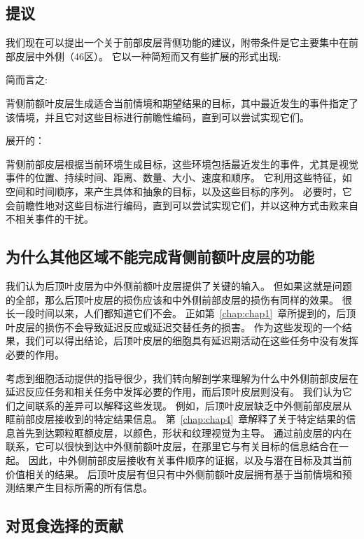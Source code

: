 \subsection{提议}

我们现在可以提出一个关于前部皮层背侧功能的建议，附带条件是它主要集中在前部皮层中外侧（46区）。
它以一种简短而又有些扩展的形式出现:

简而言之:

背侧前额叶皮层生成适合当前情境和期望结果的目标，其中最近发生的事件指定了该情境，并且它对这些目标进行前瞻性编码，直到可以尝试实现它们。


展开的：

背侧前部皮层根据当前环境生成目标，这些环境包括最近发生的事件，尤其是视觉事件的位置、持续时间、距离、数量、大小、速度和顺序。
它利用这些特征，如空间和时间顺序，来产生具体和抽象的目标，以及这些目标的序列。
必要时，它会前瞻性地对这些目标进行编码，直到可以尝试实现它们，并以这种方式击败来自不相关事件的干扰。



\subsection{为什么其他区域不能完成背侧前额叶皮层的功能}

我们认为后顶叶皮层为中外侧前额叶皮层提供了关键的输入。
但如果这就是问题的全部，那么后顶叶皮层的损伤应该和中外侧前部皮层的损伤有同样的效果。
很长一段时间以来，人们都知道它们不会。
正如第~\ref{chap:chap1}~章所提到的，后顶叶皮层的损伤不会导致延迟反应\cite{alexander1973effects}或延迟交替\cite{ettlinger1966tactile}任务的损害。
作为这些发现的一个结果，我们可以得出结论，后顶叶皮层的细胞具有延迟期活动\cite{kalaska1995deciding,snyder2000intention}在这些任务中没有发挥必要的作用。


考虑到细胞活动提供的指导很少，我们转向解剖学来理解为什么中外侧前部皮层在延迟反应任务和相关任务中发挥必要的作用，而后顶叶皮层则没有。
我们认为它们之间联系的差异可以解释这些发现。
例如，后顶叶皮层缺乏中外侧前部皮层从眶前部皮层接收到的特定结果信息。
第~\ref{chap:chap4}~章解释了关于特定结果的信息首先到达颗粒眶额皮层，以颜色，形状和纹理视觉为主导。
通过前皮层的内在联系，它可以很快到达中外侧前额叶皮层，在那里它与有关目标的信息结合在一起。
因此，中外侧前部皮层接收有关事件顺序的证据，以及与潜在目标及其当前价值相关的结果。
后顶叶皮层有但只有中外侧前额叶皮层拥有基于当前情境和预测结果产生目标所需的所有信息。



\subsection{对觅食选择的贡献}

